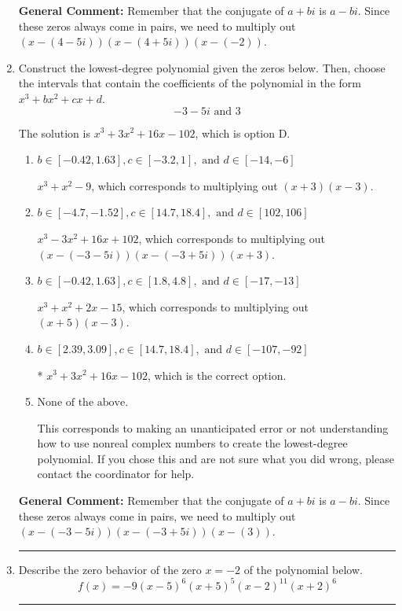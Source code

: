 \documentclass{extbook}[14pt]
\newcommand{\litem}[1]{\item #1

\rule{\textwidth}{0.4pt}}
\begin{document}
\begin{enumerate}
{\textbf{General Comment:} Remember that the conjugate of $a+bi$ is $a-bi$. Since these zeros always come in pairs, we need to multiply out $(x-(4 - 5 i))(x-(4 + 5 i))(x-(-2))$.
}
\litem{
Construct the lowest-degree polynomial given the zeros below. Then, choose the intervals that contain the coefficients of the polynomial in the form $x^3+bx^2+cx+d$.
\[ -3 - 5 i \text{ and } 3 \]

The solution is \( x^{3} +3 x^{2} +16 x -102 \), which is option D.\begin{enumerate}[label=\Alph*.]
\item \( b \in [-0.42, 1.63], c \in [-3.2, 1], \text{ and } d \in [-14, -6] \)

$x^{3} + x^{2} -9$, which corresponds to multiplying out $(x + 3)(x -3)$.
\item \( b \in [-4.7, -1.52], c \in [14.7, 18.4], \text{ and } d \in [102, 106] \)

$x^{3} -3 x^{2} +16 x + 102$, which corresponds to multiplying out $(x-(-3 - 5 i))(x-(-3 + 5 i))(x + 3)$.
\item \( b \in [-0.42, 1.63], c \in [1.8, 4.8], \text{ and } d \in [-17, -13] \)

$x^{3} + x^{2} +2 x -15$, which corresponds to multiplying out $(x + 5)(x -3)$.
\item \( b \in [2.39, 3.09], c \in [14.7, 18.4], \text{ and } d \in [-107, -92] \)

* $x^{3} +3 x^{2} +16 x -102$, which is the correct option.
\item \( \text{None of the above.} \)

This corresponds to making an unanticipated error or not understanding how to use nonreal complex numbers to create the lowest-degree polynomial. If you chose this and are not sure what you did wrong, please contact the coordinator for help.
\end{enumerate}

\textbf{General Comment:} Remember that the conjugate of $a+bi$ is $a-bi$. Since these zeros always come in pairs, we need to multiply out $(x-(-3 - 5 i))(x-(-3 + 5 i))(x-(3))$.
}
\litem{
Describe the zero behavior of the zero $x = -2$ of the polynomial below.
\[ f(x) = -9(x - 5)^{6}(x + 5)^{5}(x - 2)^{11}(x + 2)^{6} \]

}
\end{enumerate}
\end{document}
